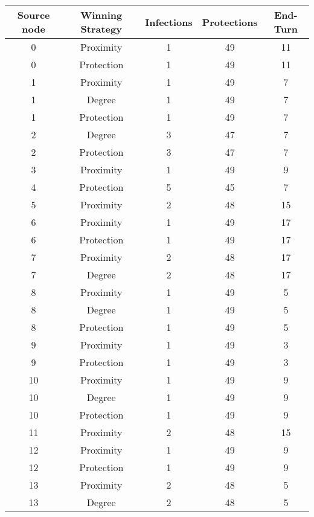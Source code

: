 \documentclass[results.tex]{subfiles}
\begin{document}
\begin{center}
  \begin{tabular}{| c || c | c | c | c |}
    \hline
    {\bfseries Source node} & {\bfseries Winning Strategy} & {\bfseries Infections} & {\bfseries Protections} & {\bfseries End-Turn} \\  %
    \hline\hline
    0 & Proximity & 1 & 49 & 11 \\ 
    \hline
    0 & Protection & 1 & 49 & 11 \\ 
    \hline
    1 & Proximity & 1 & 49 & 7 \\ 
    \hline
    1 & Degree & 1 & 49 & 7 \\ 
    \hline
    1 & Protection & 1 & 49 & 7 \\ 
    \hline
    2 & Degree & 3 & 47 & 7 \\ 
    \hline
    2 & Protection & 3 & 47 & 7 \\ 
    \hline
    3 & Proximity & 1 & 49 & 9 \\ 
    \hline
    4 & Protection & 5 & 45 & 7 \\ 
    \hline
    5 & Proximity & 2 & 48 & 15 \\ 
    \hline
    6 & Proximity & 1 & 49 & 17 \\ 
    \hline
    6 & Protection & 1 & 49 & 17 \\ 
    \hline
    7 & Proximity & 2 & 48 & 17 \\ 
    \hline
    7 & Degree & 2 & 48 & 17 \\ 
    \hline
    8 & Proximity & 1 & 49 & 5 \\ 
    \hline
    8 & Degree & 1 & 49 & 5 \\ 
    \hline
    8 & Protection & 1 & 49 & 5 \\ 
    \hline
    9 & Proximity & 1 & 49 & 3 \\ 
    \hline
    9 & Protection & 1 & 49 & 3 \\ 
    \hline
    10 & Proximity & 1 & 49 & 9 \\ 
    \hline
    10 & Degree & 1 & 49 & 9 \\ 
    \hline
    10 & Protection & 1 & 49 & 9 \\ 
    \hline
    11 & Proximity & 2 & 48 & 15 \\ 
    \hline
    12 & Proximity & 1 & 49 & 9 \\ 
    \hline
    12 & Protection & 1 & 49 & 9 \\ 
    \hline
    13 & Proximity & 2 & 48 & 5 \\ 
    \hline
    13 & Degree & 2 & 48 & 5 \\ 

\end{tabular}
\end{center}
\end{document}

